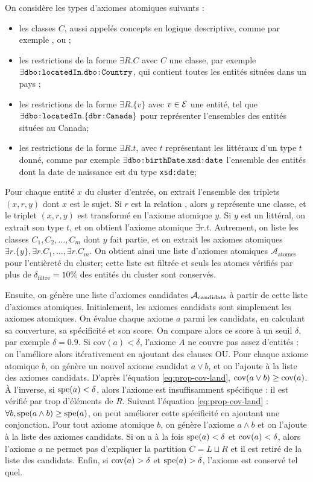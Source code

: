 On considère les types d'axiomes atomiques suivants :
\begin{itemize}
    \item les classes $C$, aussi appelés concepts en logique descriptive, comme par exemple ,  ou ;
    \item les restrictions de la forme $\exists R.C$ avec $C$ une classe, par exemple $\exists \dbo{locatedIn}.\dbo{Country}$, qui contient toutes les entités situées dans un pays ;
    \item les restrictions de la forme $\exists R.\{v\}$ avec $v \in \Ent$ une entité, tel que $\exists \dbo{locatedIn}.\{\dbr{Canada}\}$ pour représenter l'ensembles des entités situées au Canada;
    \item les restrictions de la forme $\exists R.t$, avec $t$ représentant les littéraux d'un type $t$ donné, comme par exemple $\exists \dbo{birthDate}.\texttt{xsd:date}$ l'ensemble des entités dont la date de naissance est du type \texttt{xsd:date};
\end{itemize}

Pour chaque entité $x$ du cluster d'entrée, on extrait l'ensemble des triplets $(x, r, y)$ dont $x$ est le sujet. Si $r$ est la relation , alors $y$ représente une classe, et le triplet $(x, r, y)$ est transformé en l'axiome atomique $y$. Si $y$ est un littéral, on extrait son type $t$, et on obtient l'axiome atomique $\exists r.t$. Autrement, on liste les classes $C_1, C_2, \ldots, C_m$ dont $y$ fait partie, et on extrait les axiomes atomiques $\exists r.\{y\}, \exists r.C_1, \ldots, \exists r.C_m$. On obtient ainsi une liste d'axiomes atomiques $\mathcal{A}_\text{atomes}$ pour l'entièreté du cluster; cette liste est filtrée et seuls les atomes vérifiés par plus de $\delta_\text{filtre} = 10\%$ des entités du cluster sont conservés.

Ensuite, on génère une liste d'axiomes candidates $\cal{A}_\text{candidats}$ à partir de cette liste d'axiomes atomiques. Initialement, les axiomes candidats sont simplement les axiomes atomiques. On évalue chaque axiome $a$ parmi les candidats, en calculant sa couverture, sa spécificité et son score. On compare alors ce score à un seuil $\delta$, par exemple $\delta = 0.9$. Si $\text{cov}(a) < \delta$, l'axiome $A$ ne couvre pas assez d'entités : on l'améliore alors itérativement en ajoutant des clauses OU. Pour chaque axiome atomique $b$, on génère un nouvel axiome candidat $a \lor b$, et on l'ajoute à la liste des axiomes candidats. D'après l'équation \ref{eq:prop-cov-land}, $\cov(a \lor b) \geq \cov(a)$.
À l'inverse, si $\spe(a) < \delta$, alors l'axiome est insuffisamment spécifique : il est vérifié par trop d'éléments de $R$. Suivant l'équation \ref{eq:prop-cov-land} : $\forall b, \spe(a \land b) \geq \spe(a)$, on peut améliorer cette spécificité en ajoutant une conjonction. Pour tout axiome atomique $b$, on génère l'axiome $a \land b$ et on l'ajoute à la liste des axiomes candidats. 
Si on a à la fois $\spe(a) < \delta$ et $\cov(a) < \delta$, alors l'axiome $a$ ne permet pas d'expliquer la partition $C = L \sqcup R$ et il est retiré de la liste des candidats. Enfin, si $\cov(a) > \delta$ et $\spe(a) > \delta$, l'axiome est conservé tel quel.


